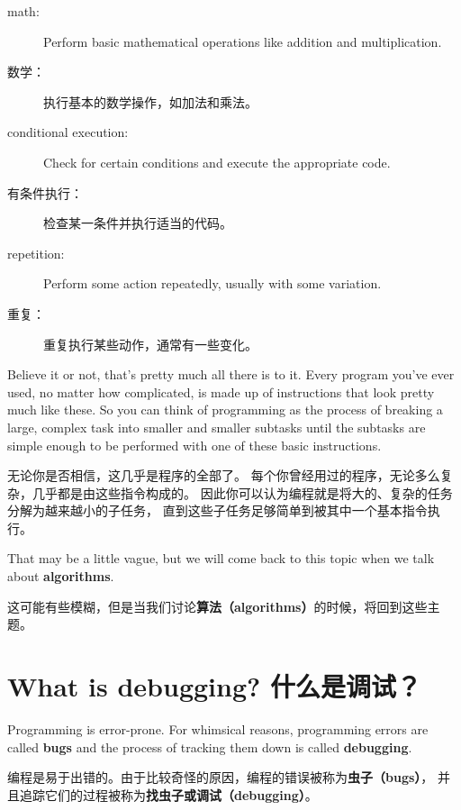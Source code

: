 \documentclass[10pt]{book}
\begin{document}
\begin{CJK}{UTF8}{gbsn}
\begin{description}
\item[math:] Perform basic mathematical operations like addition and
multiplication.

\item[数学：] 执行基本的数学操作，如加法和乘法。

\item[conditional execution:] Check for certain conditions and
execute the appropriate code.

\item[有条件执行：] 检查某一条件并执行适当的代码。

\item[repetition:] Perform some action repeatedly, usually with
some variation.

\item[重复：] 重复执行某些动作，通常有一些变化。

\end{description}

Believe it or not, that's pretty much all there is to it.  Every
program you've ever used, no matter how complicated, is made up of
instructions that look pretty much like these.  So you can think of
programming as the process of breaking a large, complex task
into smaller and smaller subtasks until the subtasks are
simple enough to be performed with one of these basic instructions.

无论你是否相信，这几乎是程序的全部了。
每个你曾经用过的程序，无论多么复杂，几乎都是由这些指令构成的。
因此你可以认为编程就是将大的、复杂的任务分解为越来越小的子任务，
直到这些子任务足够简单到被其中一个基本指令执行。

That may be a little vague, but we will come back to this topic
when we talk about {\bf algorithms}.

这可能有些模糊，但是当我们讨论{\bf 算法（algorithms）}的时候，将回到这些主题。

\section{What is debugging? 什么是调试？}

Programming is error-prone.  For whimsical reasons, programming errors
are called {\bf bugs} and the process of tracking them down is called
{\bf debugging}.

编程是易于出错的。由于比较奇怪的原因，编程的错误被称为{\bf 虫子（bugs）}，
并且追踪它们的过程被称为{\bf 找虫子或调试（debugging）}。


\end{CJK}
\end{document}
